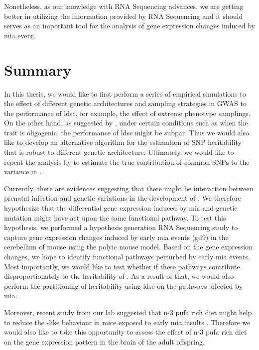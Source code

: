 	Nonetheless, as our knowledge with RNA Sequencing advances, we are getting better in utilizing the information provided by RNA Sequencing and it should serves as an important tool for the analysis of gene expression changes induced by \gls{mia} event.
	
	\section{Summary}
	In this thesis, we would like to first perform a series of empirical simulations to the effect of different genetic architectures and sampling strategies in \gls{GWAS} to the performance of \gls{ldsc}, for example, the effect of extreme phenotype samplings.
	On the other hand, as suggested by \citet{Bulik-Sullivan2015}, under certain conditions such as when the trait is oligogenic, the performance of \gls{ldsc} might be subpar. 
	Thus we would also like to develop an alternative algorithm for the estimation of \gls{SNP} heritability that is robust to different genetic architecture.
	Ultimately, we would like to repeat the analysis by \citet{Bulik-Sullivan2015} to estimate the true contribution of common \glspl{SNP} to the variance in .

	Currently, there are evidences suggesting that there might be interaction between prenatal infection and genetic variations in the development of  \citep{Tienari2004,Clarke2009}.
	We therefore hypothesize that the differential gene expression induced by \gls{mia} and genetic mutation might have act upon the same functional pathway.
	To test this hypothesis, we performed a hypothesis generation RNA Sequencing study to capture gene expression changes induced by early \gls{mia} events (\gls{gd}9) in the cerebellum of mouse using the \gls{polyic} mouse model.
	Based on the gene expression changes, we hope to identify functional pathways perturbed by early \gls{mia} events.
	Most importantly, we would like to test whether if these pathways contribute disproportionately to the heritability of .
	As a result of that, we would also perform the partitioning of heritability using \gls{ldsc} on the pathways affected by \gls{mia}.
	
	Moreover, recent study from our lab suggested that n-3 \gls{pufa} rich diet might help to reduce the -like behaviour in mice exposed to early \gls{mia} insults \citep{Li2015}. 
	Therefore we would also like to take this opportunity to assess the effect of n-3 \gls{pufa} rich diet on the gene expression pattern in the brain of the adult offspring.
	
